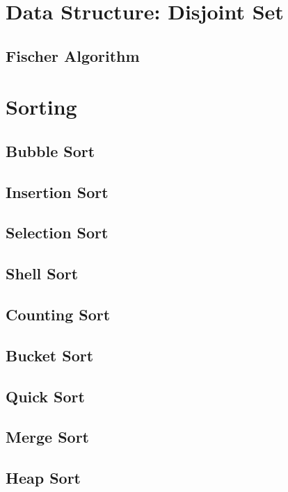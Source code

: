 \documentclass{article}
\begin{document}
\section{Data Structure: Disjoint Set}
    \subsection{Fischer Algorithm}
        

\section{Sorting}
    \subsection{Bubble Sort}
        
    \subsection{Insertion Sort}
        
    \subsection{Selection Sort}
        
    \subsection{Shell Sort}
    \subsection{Counting Sort}
        
    \subsection{Bucket Sort}
        
    \subsection{Quick Sort}
        
    \subsection{Merge Sort}
        
    \subsection{Heap Sort}
\end{document}
